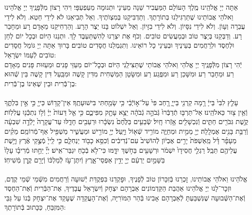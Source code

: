 \documentclass[twoside, openany, parskip=half, 11pt]{book}
\begin{document}
אַתָּה יְיָ אֱלֹהֵֽינוּ מֶֽלֶךְ הָעוֹלָם הַמַּעֲבִיר שֵׁנָה מֵעֵינָי וּתְנוּמָה מֵעַפְעַפָּי׃ וִיהִי רָצוֹן מִלְּֿפָנֶֽיךָ יְיָ אֱלֹהֵינוּ וֵאלֹהֵי אֲבוֹתֵינוּ שֶׁתַּרְגִּילֵנוּ בְּתוֹרָתֶךָ. וְתַדְבִּיקֵנוּ בְּמִצְוׂתֶיךָ. וְאַל תְּבִיאֵנוּ לֹא לִידֵי חֵטְא. וְלֹא לִידֵי עֲבֵרָה וְעָוׂן. וְלֹא לִידֵי נִסָּיוֹן. וְלֹא לִידֵי בִזָּיוֹן. וְאַל יִשְׁלוֹט בָּנוּ יֵצֶר הָרָע. וְהַרְחִיקֵנוּ מֵאָדָם רָע וּמֵחָבֵר רָע. וְדַבְּקֵנוּ בְּיֵצֶר טוֹב וּבְמַעֲשִׂים טוֹבִים. וְכֹף אֶת יִצְרֵנוּ לְהִשְׁתַּעְבֶּד לָךְ. וּתְנֵנוּ הַיּוֹם וּבְכָל יוֹם לְחֵן וּלְחֶסֶד וּלְרַחֲמִים בְּעֵינֶיךָ וּבְעֵינֵי כָל רוֹאֵינוּ. וְתִגְמְלֵנוּ חֲסָדִים טוֹבִים׃ בָּרוּךְ אַתָּה יְיָ גּוֹמֵל חֲסָדִים טוֹבִים לְֿעַמּוֹ יִשְׂרָאֵל:\\
יְֿהִי רָצוֹן מִלְּֿפָנֶֽיךָ יְיָ אֱלֹהַי וֵאלֹהֵי אֲבוֹתַי שֶׁתַּצִּילֵֽנִי הַיּוֹם וּבְכׇל־יוֹם מֵעַזֵּי פָנִים וּמֵעַזּוּת פָּנִים מֵאָדָם רַע וּמֵחָבֵר רַע וּמִשָּׁכֵן רַע וּמִפֶּֽגַע רַע וּמִשָּׂטָן הַמַּשְׁחִית מִדִּין קָשֶׁה וּמִבַּֽעַל דִּין קָשֶׁה בֵּין שְֿׁהוּא בֶן־בְּֿֿרִית וּבֵין שֶׁאֵינוֹ בֶן־בְּֿֿרִית:\\
\\
 עָלַ֤ץ לִבִּי֙ בַּייָ֔ רָ֥מָה קַרְנִ֖י בַּייָ֑ רָ֤חַב פִּי֙ עַל־א֣וֹיְֿבַ֔י כִּ֥י שָׂמַ֖חְתִּי בִּישׁוּעָתֶֽךָ׃ אֵין־קָד֥וֹשׁ כַּייָ֖ כִּ֣י אֵ֣ין בִּלְתֶּ֑ךָ וְֿאֵ֥ין צ֖וּר כֵּאלֹהֵֽינוּ׃ אַל־תַּרְבּ֤וּ תְֿדַבְּֿרוּ֙ גְּֿבֹהָ֣ה גְֿבֹהָ֔ה יֵצֵ֥א עָתָ֖ק מִפִּיכֶ֑ם כִּ֣י אֵ֤ל דֵּעוֹת֙ יְיָ֔ וְֿל֥וֹ נִתְכְּֿֿנ֖וּ עֲלִלֽוֹת׃ קֶ֥שֶׁת גִּבֹּרִ֖ים חַתִּ֑ים וְֿנִכְשָׁלִ֖ים אָ֥זְֿרוּ חָֽיִל׃ שְֿׂבֵעִ֤ים בַּלֶּ֙חֶם֙ נִשְׂכָּ֔רוּ וּרְעֵבִ֖ים חָדֵ֑לּוּ עַד־עֲקָרָה֙ יָלְֿדָ֣ה שִׁבְעָ֔ה וְֿרַבַּ֥ת בָּנִ֖ים אֻמְלָֽלָה׃ יְיָ֖ מֵמִ֣ית וּמְחַיֶּ֑ה מוֹרִ֥יד שְֿׁא֖וֹל וַיָּֽעַל׃ יְיָ֖ מוֹרִ֣ישׁ וּמַעֲשִׁ֑יר מַשְׁפִּ֖יל אַף־מְֿרוֹמֵֽם׃ מֵקִ֨ים מֵעָפָ֜ר דָּ֗ל מֵֽאַשְׁפֹּת֙ יָרִ֣ים אֶבְי֔וֹן לְֿהוֹשִׁיב֙ עִם־נְֿדִיבִ֔ים וְֿכִסֵּ֥א כָב֖וֹד יַנְחִלֵ֑ם כִּ֤י לַֽייָ֙ מְֿצֻ֣קֵי אֶ֔רֶץ וַיָּ֥שֶׁת עֲלֵיהֶ֖ם תֵּבֵֽל׃ רַגְלֵ֤י חֲסִידָו֙ יִשְׁמֹ֔ר וּרְשָׁעִ֖ים בַּחֹ֣שֶׁךְ יִדָּ֑מּוּ כִּי־לֹ֥א בְֿכֹ֖חַ יִגְבַּר־אִֽישׁ׃ יְיָ֞ יֵחַ֣תּוּ מְֿרִיבָ֗ו עָלָו֙ בַּשָּׁמַ֣יִם יַרְעֵ֔ם יְיָ֖ יָדִ֣ין אַפְסֵי־אָ֑רֶץ וְֿיִתֶּן־עֹ֣ז לְֿמַלְכּ֔וֹ וְֿיָרֵ֖ם קֶ֥רֶן מְֿשִׁיחֽוֹ׃\\
\\
אֱלֹהֵינוּ וֵאלֹהֵי אֲבוֹתֵינוּ, זׇכְרֵנוּ בְּֿזִכָּרוֹן טוֹב לְֿפָנֶיךָ, וּפׇקְדֵנוּ בִּפְקֻדַּת יְֿשׁוּעָה וְֿרַחֲמִים מִשְּֿׁמֵי שְֿׁמֵי קֶדֶם, וּזְכׇר־לָנוּ יְיָ אֱלֹהֵינוּ אַהֲבַת הַקַּדְמוֹנִים אַבְרָהָם יִצְחָק וְֿיִשְׂרָאֵל עֲבָדֶיךָ, אֶת־הַבְּֿרִית וְֿאֶת־הַחֶסֶד וְֿאֶת־הַשְּֿׁבוּעָה שֶׁנִּשְׁבַּעְתָּ לְֿאַבְרָהָם אָבִינוּ בְּֿהַר הַמּוֹרִיָּה, וְֿאֶת־הָעֲקֵדָה שֶׁעָקַד אֶת־יִצְחָק בְּֿנוֹ עַל גַּבֵּי הַמִּזְבֵּחַ, כַּכָּתוּב בְּֿתוֹרָתֶךָ:\\
\end{document}
